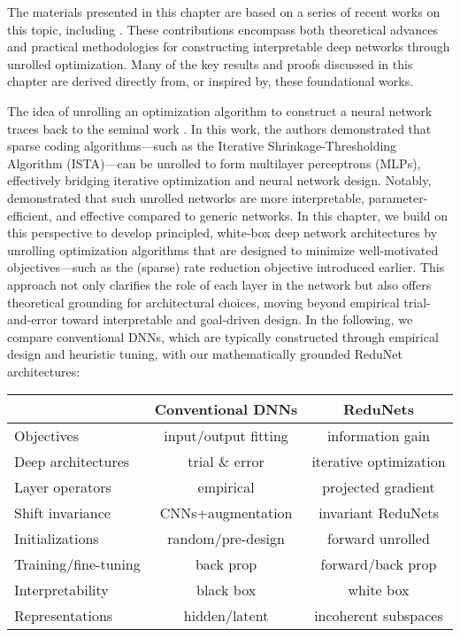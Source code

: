 \documentclass[../../book-main.tex]{subfiles}
\begin{document}
The materials presented in this chapter are based on a series of recent works on this topic, including \cite{chan2021redunet, wang2024global, wang2025attention, wu2025token, yu2023white}. These contributions encompass both theoretical advances and practical methodologies for constructing interpretable deep networks through unrolled optimization. Many of the key results and proofs discussed in this chapter are derived directly from, or inspired by, these foundational works. 


The idea of unrolling an optimization algorithm to construct a neural network traces back to the seminal work \cite{gregor2010learning}. In this work, the authors demonstrated that sparse coding algorithms—such as the Iterative Shrinkage-Thresholding Algorithm (ISTA)—can be unrolled to form multilayer perceptrons (MLPs), effectively bridging iterative optimization and neural network design. Notably, \cite{monga2019algorithm} demonstrated that such unrolled networks are more interpretable, parameter-efficient, and effective compared to generic networks. In this chapter, we build on this perspective to develop principled, white-box deep network architectures by unrolling optimization algorithms that are designed to minimize well-motivated objectives—such as the (sparse) rate reduction objective introduced earlier. This approach not only clarifies the role of each layer in the network but also offers theoretical grounding for architectural choices, moving beyond empirical trial-and-error toward interpretable and goal-driven design.  In the following, we compare conventional DNNs, which are typically constructed through empirical design and heuristic tuning, with our mathematically grounded ReduNet architectures: 

\begin{center}
\begin{tabular}{| l || c | c |}
\hline
  & Conventional DNNs & ReduNets\\ [0.5ex]
  \hline \hline
Objectives & input/output fitting & information gain\\ [0.5ex]
  \hline
Deep architectures & trial \& error & iterative optimization \\  [0.5ex]
\hline
Layer operators & empirical & projected gradient \\  [0.5ex]
\hline
Shift invariance & CNNs+augmentation & invariant ReduNets \\  [0.5ex]
\hline
Initializations & random/pre-design & forward unrolled \\ [0.5ex]
\hline
Training/fine-tuning & back prop & forward/back prop\\ [0.5ex]
\hline
Interpretability & black box & white box \\ [0.5ex]
\hline
Representations & hidden/latent & incoherent subspaces \\ [0.5ex]
\hline
\end{tabular}
\end{center}
\end{document}
